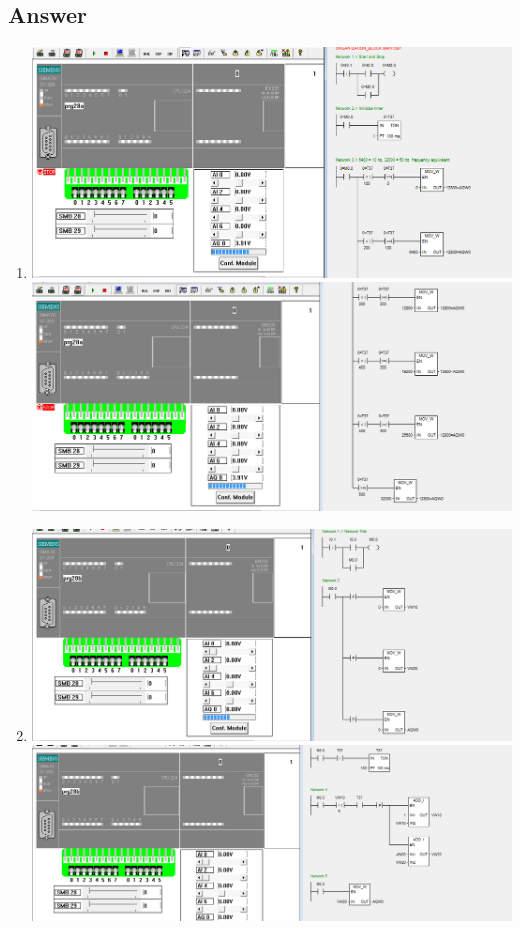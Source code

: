 \documentclass[
	12pt, %
]{fphw}
\begin{document}
\subsection*{Answer}
\begin{enumerate}
\item
  \begin{center}
    \includegraphics[width = 165mm, scale = 0.9]{prg28a1.png}
    \includegraphics[width = 165mm, scale = 0.9]{prg28a2.png}
    \end{center}
\item
    \begin{center}
      \includegraphics[width = 165mm, scale = 0.9]{prg28b1.png}
      \includegraphics[width = 165mm, scale = 0.9]{prg28b2.png}

\end{center}
\end{enumerate}
\end{document}
